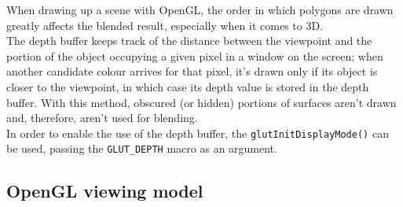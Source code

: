 When drawing up a scene with OpenGL, the order in which polygons are drawn
greatly affects the blended result, especially when it comes to 3D.
\\
The depth buffer keeps track of the distance between the viewpoint and 
the portion of the object occupying a given pixel in a window on the 
screen; when another candidate colour arrives for that pixel, it's drawn 
only if its object is closer to the viewpoint, in which case its depth
value is stored in the depth buffer. With this method, obscured (or hidden)
portions of surfaces aren't drawn and, therefore, aren't used for
blending.
\\
In order to enable the use of the depth buffer, the 
\texttt{glutInitDisplayMode()} can be used, passing the 
\texttt{GLUT\_DEPTH} macro as an argument.

\subsection{OpenGL viewing model}
\label{opengl:opengl_note:viewing_model}

